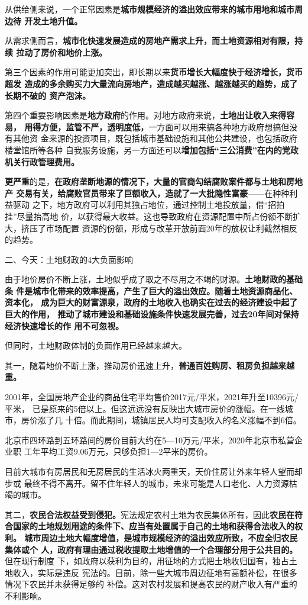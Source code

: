 从供给侧来说，一个正常因素是\textbf{城市规模经济的溢出效应带来的城市用地和城市周边待
开发土地升值。}

从需求侧而言，\textbf{城市化快速发展造成的房地产需求上升，而土地资源相对有限，持续
  拉动了房价和地价上涨。}

第三个因素的作用可能更加突出，即长期以来\textbf{货币增长大幅度快于经济增长，货币超发
造成的多余购买力大量流向房地产，造成越买越涨、越涨越买的趋势，成了长期不破的
资产泡沫。}

第四个重要影响因素是\textbf{地方政府}的作用。对地方政府来说，\textbf{土地出让收入来得容易，
  用得方便，监管不严，透明度低，}一方面可以用来搞各种地方政府想搞但没有其他资
金来源的投资项目，既包括城市基础设施和其他公共建设，也包括政府楼堂馆所等各种
自我服务设施，另一方面还可以\textbf{增加包括“三公消费”在内的党政机关行政管理费用。}

\textbf{更严重}的是，\textbf{在政府垄断地源的情况下，大量的官商勾结腐败案件都与土地和房地产
  交易有关，给腐败官员带来了巨额收入，造就了一大批隐性富豪}——在种种利益驱动
之下，地方政府可以利用其独占地位，通过控制土地投放量，借“招拍挂”尽量抬高地
价，以获得最大收益。这也导致政府在资源配置中所占份额不断扩大，挤压了市场配置
资源的份额，形成与改革开放前面20年的放权让利截然相反的趋势。

{\heiti 二、今天：土地财政的4大负面影响}

由于地价房价不断上涨，土地似乎成了取之不尽用之不竭的财源。\textbf{土地财政的基础条
  件是城市化带来的效率提高，产生了巨大的溢出效应。随着土地资源商品化、资本化，
  成为巨大的财富源泉，政府的土地收入也确实在过去的经济建设中起了巨大的作用，
  推动了城市建设和基础设施条件快速发展完善，过去20年间对保持经济快速增长的作
  用不可忽视。}

但同时，土地财政体制的负面作用已经越来越大。

其一，随着地价不断上涨，推动房价迅速上升，\textbf{普通百姓购房、租房负担越来越重。}

2001年，全国房地产企业的商品住宅平均售价2017元/平米，2021年升至10396元/平米，
已是原来的5倍以上。但这远远没有反映出大城市房价的涨幅。在一线城市，房价涨了几
十倍。而此期间，城镇居民人均可支配收入的名义涨幅不到6倍。

北京市四环路到五环路间的房价目前大约在5—10万元/平米，2020年北京市私营企业职
工年平均工资9.06万元，只够负担1—2平米的房价。

目前大城市有房居民和无房居民的生活冰火两重天，天价住房让外来年轻人望而却步或
最终不得不离开。留不住年轻人的城市，未来可能是人口老化、人力资源枯竭的城市。

其二，\textbf{农民合法权益受到侵犯。}宪法规定农村土地为农民集体所有，因此\textbf{农民在符
  合国家的土地规划用途的条件下、应当有处置属于自己的土地和获得合法收入的权利。
  城市周边土地大幅度增值，是城市规模经济的溢出效应所致，不应全归农民集体或个
  人，政府有理由通过税收提取土地增值的一个合理部分用于公共目的。}但在现行制度
下，如政府以获利为目的，用征地的方式把土地收归国有，独占土地收入，实际是违反
宪法的。目前，除一些大城市周边征地有高额补偿，在很多情况下农民并未获得足够的
补偿。这对农村发展和提高农民的财产收入有严重的不利影响。

